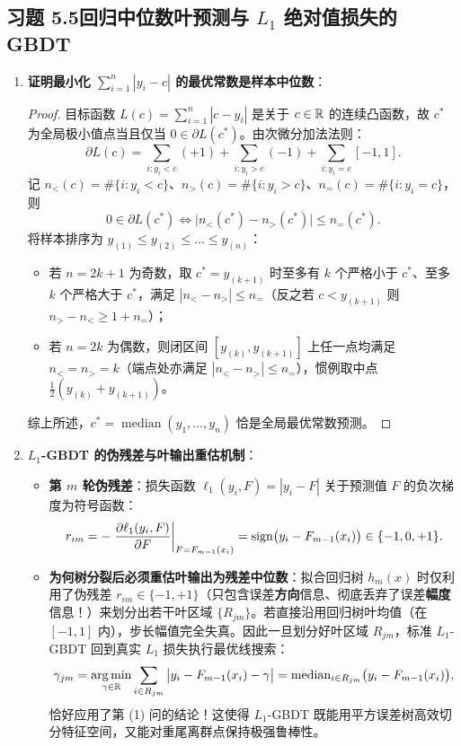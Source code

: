 \subsection*{习题 5.5\quad 回归中位数叶预测与 $L_1$ 绝对值损失的 GBDT}
\begin{enumerate}[label=(\arabic*), leftmargin=1.8em]
  \item \textbf{证明最小化 $\sum_{i=1}^n |y_i - c|$ 的最优常数是样本中位数}：
  \begin{proof}
  目标函数 $L(c) = \sum_{i=1}^n |c - y_i|$ 是关于 $c \in \mathbb{R}$ 的连续凸函数，故 $c^*$ 为全局极小值点当且仅当 $0 \in \partial L(c^*)$。由次微分加法法则：
  \[
    \partial L(c) = \sum_{i : y_i < c} (+1) + \sum_{i : y_i > c} (-1) + \sum_{i : y_i = c} [-1, 1].
  \]
  记 $n_<(c) = \#\{i : y_i < c\}$、$n_>(c) = \#\{i : y_i > c\}$、$n_=(c) = \#\{i : y_i = c\}$，则
  \[
    0 \in \partial L(c^*)
    \iff \big|n_<(c^*) - n_>(c^*)\big| \le n_=(c^*).
  \]
  将样本排序为 $y_{(1)} \le y_{(2)} \le \dots \le y_{(n)}$：
  \begin{itemize}
    \item 若 $n = 2k + 1$ 为奇数，取 $c^* = y_{(k+1)}$ 时至多有 $k$ 个严格小于 $c^*$、至多 $k$ 个严格大于 $c^*$，满足 $|n_< - n_>| \le n_=$（反之若 $c < y_{(k+1)}$ 则 $n_> - n_< \ge 1 + n_=$）；
    \item 若 $n = 2k$ 为偶数，则闭区间 $[y_{(k)}, y_{(k+1)}]$ 上任一点均满足 $n_< = n_> = k$（端点处亦满足 $|n_< - n_>| \le n_=$），惯例取中点 $\frac{1}{2}(y_{(k)} + y_{(k+1)})$。
  \end{itemize}
  综上所述，$c^* = \operatorname{median}(y_1, \dots, y_n)$ 恰是全局最优常数预测。
  \end{proof}

  \item \textbf{$L_1$-GBDT 的伪残差与叶输出重估机制}：
  \begin{itemize}
    \item \textbf{第 $m$ 轮伪残差}：损失函数 $\ell_1(y_i, F) = |y_i - F|$ 关于预测值 $F$ 的负次梯度为符号函数：
    \[
      r_{im} = -\left.\frac{\partial \ell_1(y_i, F)}{\partial F}\right|_{F = F_{m-1}(x_i)} = \operatorname{sign}\!\big(y_i - F_{m-1}(x_i)\big) \in \{-1, 0, +1\}.
    \]
    \item \textbf{为何树分裂后必须重估叶输出为残差中位数}：拟合回归树 $h_m(x)$ 时仅利用了伪残差 $r_{im} \in \{-1, +1\}$（只包含误差\textbf{方向}信息、彻底丢弃了误差\textbf{幅度}信息！）来划分出若干叶区域 $\{R_{jm}\}$。若直接沿用回归树叶均值（在 $[-1, 1]$ 内），步长幅值完全失真。因此一旦划分好叶区域 $R_{jm}$，标准 $L_1$-GBDT 回到真实 $L_1$ 损失执行最优线搜索：
    \[
      \gamma_{jm} = \operatorname*{arg\,min}_{\gamma \in \mathbb{R}} \sum_{i \in R_{jm}} \big|y_i - F_{m-1}(x_i) - \gamma\big|
      = \operatorname{median}_{i \in R_{jm}}\!\big(y_i - F_{m-1}(x_i)\big),
    \]
    恰好应用了第 (1) 问的结论！这使得 $L_1$-GBDT 既能用平方误差树高效切分特征空间，又能对重尾离群点保持极强鲁棒性。
  \end{itemize}
\end{enumerate}

